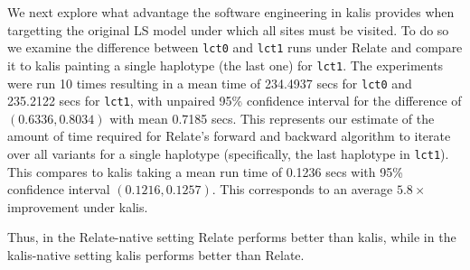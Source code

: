 \documentclass[a4paper]{article}
\newcommand{\pkg}[1]{{\fontseries{m}\fontseries{b}\selectfont #1}}
\begin{document}
We next explore what advantage the software engineering in \pkg{kalis} provides when targetting the original LS model under which all sites must be visited.
To do so we examine the difference between \texttt{lct0} and \texttt{lct1} runs under Relate and compare it to \pkg{kalis} painting a single haplotype (the last one) for \texttt{lct1}.
The experiments were run 10 times resulting in a mean time of 234.4937 secs for \texttt{lct0} and 235.2122 secs for \texttt{lct1}, with unpaired 95\% confidence interval for the difference of $(0.6336,0.8034)$ with mean 0.7185 secs.
This represents our estimate of the amount of time required for Relate's forward and backward algorithm to iterate over all variants for a single haplotype (specifically, the last haplotype in \texttt{lct1}).
This compares to \pkg{kalis} taking a mean run time of 0.1236 secs with 95\% confidence interval $(0.1216, 0.1257)$.
This corresponds to an average $5.8\times$ improvement under \pkg{kalis}.

Thus, in the Relate-native setting Relate performs better than \pkg{kalis}, while in the \pkg{kalis}-native setting \pkg{kalis} performs better than Relate.




\end{document}
